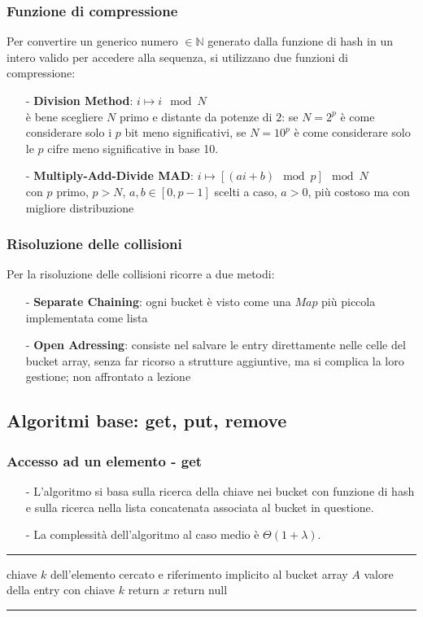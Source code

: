\documentclass[a4paper]{article}
\makeatletter
\newenvironment{algo}[4]{
	\noindent\rule{\textwidth}{0.4pt}
	\begin{algorithmic}[1]
		\addtocounter{ALG@line}{-1}
		\Procedure{#1}{#2}
		\Require #3
		\Ensure #4
		\Statex }{
		\EndProcedure
	\end{algorithmic}
	\rule{\textwidth}{0.4pt}}
\makeatother
\begin{document}
\subsubsection*{Funzione di compressione}
Per convertire un generico numero \(\in \mathbb{N}\) generato dalla funzione di hash in un intero valido per accedere alla sequenza,
si utilizzano due funzioni di compressione:
\begin{itemize}[topsep=3pt, itemsep=0pt]
	\item[-] \textbf{Division Method}: \(i \mapsto i \mod N\) \\
	è bene scegliere \(N\) primo e distante da potenze di \(2\): se \(N = 2^p\) è come considerare solo i \(p\) bit meno
	significativi, se \(N = 10^p\) è come considerare solo le \(p\) cifre meno significative in base 10.
	\item[-] \textbf{Multiply-Add-Divide MAD}: \(i \mapsto [(ai+b) \mod p] \mod N\) \\
	con \(p\) primo, \(p > N\), \(a,b \in [0,p-1]\) scelti a caso, \(a > 0\), più costoso ma con migliore distribuzione
\end{itemize}

\subsubsection*{Risoluzione delle collisioni}
Per la risoluzione delle collisioni ricorre a due metodi:
\begin{itemize}[topsep=3pt, itemsep=0pt]
	\item[-] \textbf{Separate Chaining}: ogni bucket è visto come una \(Map\) più piccola implementata come lista
	\item[-] \textbf{Open Adressing}: consiste nel salvare le entry direttamente nelle celle del bucket array, senza far ricorso
	a strutture aggiuntive, ma si complica la loro gestione; non affrontato a lezione
\end{itemize}

\newpage

\subsection{Algoritmi base: get, put, remove}
\subsubsection*{Accesso ad un elemento - get}
\begin{itemize}[topsep=3pt, itemsep=0pt]
	\item[-] L'algoritmo si basa sulla ricerca della chiave nei bucket con funzione di hash e sulla ricerca nella lista concatenata
	associata al bucket in questione.
	\item[-] La complessità dell'algoritmo al caso medio è \(\Theta(1+\lambda)\).
\end{itemize}
\begin{algo}{get}{$k$}{chiave $k$ dell'elemento cercato e riferimento implicito al bucket array $A$}{valore della entry con chiave $k$}
		\State return $x$
	\Else
		\State return null
	\EndIf
\end{algo}
\end{document}
